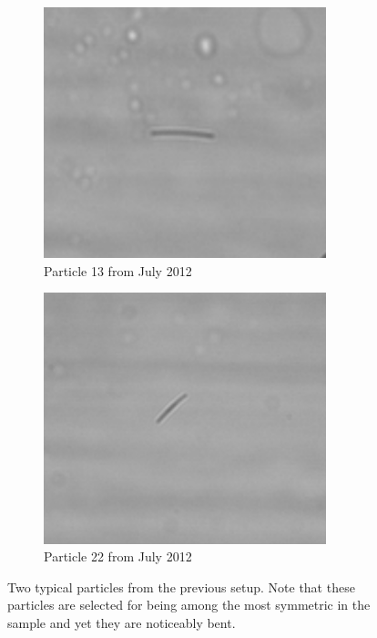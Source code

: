 \label{sec:particle_improves}
\begin{figure}[H]
\centering
\begin{subfigure}[b]{0.45\textwidth}
\includegraphics[width=0.9\textwidth]{figures/improvements/oldparticle2.png}
\caption{Particle 13 from July 2012}
\end{subfigure}
\begin{subfigure}[b]{0.45\textwidth}
\includegraphics[width=0.9\textwidth]{figures/improvements/oldparticle3.png}
\caption{Particle 22 from July 2012}
\end{subfigure}
\caption{Two typical particles from the previous setup. Note that these particles are selected for being among the most symmetric in the sample and yet they are noticeably bent.}
\label{fig:oldparticles}
\end{figure}



